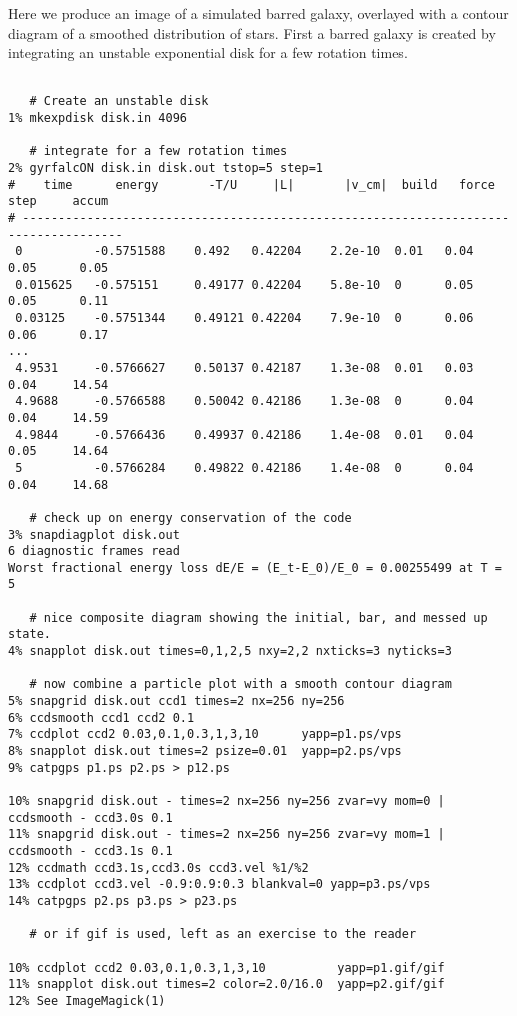 Here we produce an image of a simulated barred galaxy, overlayed with a contour diagram
of a smoothed distribution of stars. First a barred galaxy is created by
integrating an unstable exponential disk for a few rotation times.

\footnotesize\begin{verbatim}

   # Create an unstable disk
1% mkexpdisk disk.in 4096 

   # integrate for a few rotation times
2% gyrfalcON disk.in disk.out tstop=5 step=1
#    time      energy       -T/U     |L|       |v_cm|  build   force    step     accum
# ------------------------------------------------------------------------------------
 0          -0.5751588    0.492   0.42204    2.2e-10  0.01   0.04       0.05      0.05
 0.015625   -0.575151     0.49177 0.42204    5.8e-10  0      0.05       0.05      0.11
 0.03125    -0.5751344    0.49121 0.42204    7.9e-10  0      0.06       0.06      0.17
...
 4.9531     -0.5766627    0.50137 0.42187    1.3e-08  0.01   0.03       0.04     14.54
 4.9688     -0.5766588    0.50042 0.42186    1.3e-08  0      0.04       0.04     14.59
 4.9844     -0.5766436    0.49937 0.42186    1.4e-08  0.01   0.04       0.05     14.64
 5          -0.5766284    0.49822 0.42186    1.4e-08  0      0.04       0.04     14.68

   # check up on energy conservation of the code
3% snapdiagplot disk.out
6 diagnostic frames read
Worst fractional energy loss dE/E = (E_t-E_0)/E_0 = 0.00255499 at T = 5

   # nice composite diagram showing the initial, bar, and messed up state.
4% snapplot disk.out times=0,1,2,5 nxy=2,2 nxticks=3 nyticks=3

   # now combine a particle plot with a smooth contour diagram
5% snapgrid disk.out ccd1 times=2 nx=256 ny=256
6% ccdsmooth ccd1 ccd2 0.1
7% ccdplot ccd2 0.03,0.1,0.3,1,3,10      yapp=p1.ps/vps
8% snapplot disk.out times=2 psize=0.01  yapp=p2.ps/vps 
9% catpgps p1.ps p2.ps > p12.ps

10% snapgrid disk.out - times=2 nx=256 ny=256 zvar=vy mom=0 | ccdsmooth - ccd3.0s 0.1
11% snapgrid disk.out - times=2 nx=256 ny=256 zvar=vy mom=1 | ccdsmooth - ccd3.1s 0.1
12% ccdmath ccd3.1s,ccd3.0s ccd3.vel %1/%2
13% ccdplot ccd3.vel -0.9:0.9:0.3 blankval=0 yapp=p3.ps/vps
14% catpgps p2.ps p3.ps > p23.ps

   # or if gif is used, left as an exercise to the reader

10% ccdplot ccd2 0.03,0.1,0.3,1,3,10          yapp=p1.gif/gif
11% snapplot disk.out times=2 color=2.0/16.0  yapp=p2.gif/gif
12% See ImageMagick(1)

\end{verbatim}\normalsize

